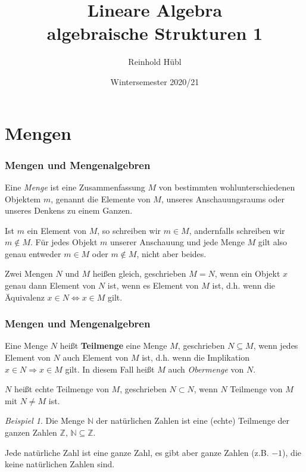 \documentclass[hyperref={pdfpagelabels=false}]{beamer}
\title{Lineare Algebra \\ algebraische Strukturen 1}
\author{ Reinhold Hübl}
\date{Wintersemester 2020/21}
\theoremstyle{plain}%
\theoremstyle{definition}
\theoremstyle{remark}
\newtheorem*{beispiel}{Beispiel}
\def \N{\mathbb N}
\def \Z{\mathbb Z}
\begin{document}
\begin{frame}
\titlepage
\centering 
 
\end{frame} 



\section{Mengen}

\begin{frame}
\frametitle{Mengen und Mengenalgebren}

\begin{definition} Eine \textit{Menge}  ist eine Zusammenfassung $M$ von bestimmten wohlunterschiedenen 
Objektem $m$, genannt die Elemente von $M$, unseres Anschauungsraums oder unseres Denkens zu einem Ganzen.
\end{definition}

\bigbreak

\pause

Ist $m$ ein Element  von $M$, so schreiben wir $m \in M$, andernfalls schreiben wir $m \notin M$. 
F\"ur jedes Objekt $m$ unserer Anschauung und jede Menge $M$ gilt also genau entweder $m \in M$  oder 
$m \notin M$, nicht aber beides. 

\medbreak

\pause 

\begin{definition} Zwei Mengen $N$ und $M$ hei{\ss}en gleich, geschrieben $M = N$, wenn ein Objekt 
$x$ genau dann Element von $N$ ist, wenn es Element von $M$ ist, d.h. wenn die Äquivalenz 
$x \in N \iff x \in M$ gilt.
\end{definition}
\end{frame}

\begin{frame}
\frametitle{Mengen und Mengenalgebren}

\begin{definition} Eine Menge $N$ hei{\ss}t \textbf{Teilmenge} eine Menge $M$, geschrieben 
$N \subseteq M$, wenn jedes Element von $N$ auch Element von $M$ ist, d.h. wenn die Implikation 
$x \in N \Longrightarrow x \in M$ gilt. In diesem Fall hei{\ss}t $M$ auch \textit{Obermenge} 
von $N$.

\pause 

$N$ hei{\ss}t echte Teilmenge von $M$, geschrieben $N \subset 
N$, wenn $N$ Teilmenge von $M$ mit $N \neq M$ ist.
\end{definition}

\medbreak

\pause

\begin{beispiel} Die Menge $\mathbb N$ der natürlichen Zahlen ist eine (echte) Teilmenge der 
ganzen Zahlen $\Z$, $\N \subseteq \Z$. 

\pause 

Jede natürliche Zahl ist eine ganze Zahl, es gibt aber ganze Zahlen (z.B. $-1$), die keine natürlichen 
Zahlen sind. 
\end{beispiel}

\end{frame}
\end{document}
